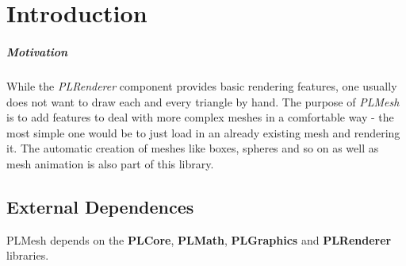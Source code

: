 \chapter{Introduction}


\paragraph{Motivation}
While the \emph{PLRenderer} component provides basic rendering features, one usually does not want to draw each and every triangle by hand. The purpose of \emph{PLMesh} is to add features to deal with more complex meshes in a comfortable way - the most simple one would be to just load in an already existing mesh and rendering it. The automatic creation of meshes like boxes, spheres and so on as well as mesh animation is also part of this library.




\section{External Dependences}
PLMesh depends on the \textbf{PLCore}, \textbf{PLMath}, \textbf{PLGraphics} and \textbf{PLRenderer} libraries.
